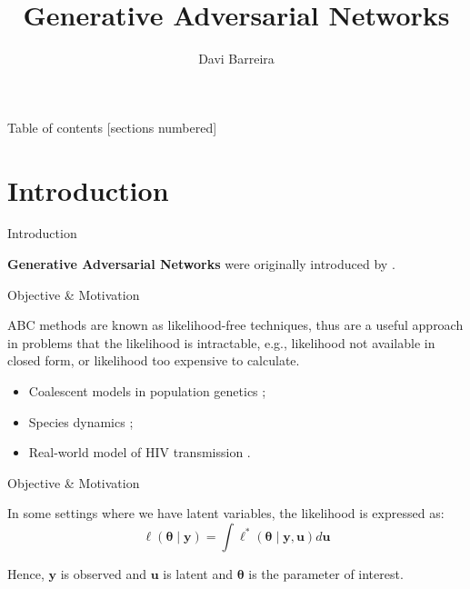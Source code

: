 \documentclass[10pt]{beamer}
\title{Generative Adversarial Networks}
\subtitle{}
\date{}
\author{Davi Barreira}
\institute{FGV - Escola de Matemática Aplicada}
\begin{document}
\maketitle

\begin{frame}{Table of contents}
  [sections numbered]
  \tableofcontents[hideallsubsections]
\end{frame}

\AtBeginSection{}
\section[Introduction]{Introduction}
\begin{frame}[fragile]{Introduction}

	\textbf{Generative Adversarial Networks} were originally introduced
	by \citet{goodfellow2014}.

\end{frame}

\begin{frame}[fragile]{Objective \& Motivation}

  ABC methods are known as likelihood-free techniques, thus are
  a useful approach in problems that the likelihood is intractable, e.g., likelihood not available in
  closed form, or likelihood too expensive to calculate.
  \begin{itemize}
    \item Coalescent models in population genetics \citep{Tavare505};
    \item Species dynamics \citep{Jabot2016};
    \item Real-world model of HIV transmission \citep{McKinley2018}.
  \end{itemize}

\end{frame}

\begin{frame}[fragile]{Objective \& Motivation}

  In some settings where we have latent variables, the likelihood is
  expressed as:
  $$\ell(\bm\theta \mid \bm y) =
  \bm\int \ell^*(\bm\theta \mid \bm y, \bm u) d\bm u$$

  Hence, $\bm y$ is observed and $\bm u$ is latent and $\bm\theta$
  is the parameter of interest.

\end{frame}

\AtBeginSection{}
\end{document}
